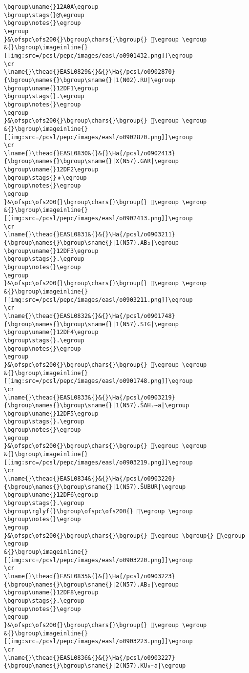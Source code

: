 \begin{verbatim}
\bgroup\uname{}12A0A\egroup
\bgroup\stags{}@\egroup
\bgroup\notes{}\egroup
\egroup
}&\ofspc\ofs200{}\bgroup\chars{}\bgroup{} 𒨊\egroup \egroup
&{}\bgroup\imageinline{}[[img:src=/pcsl/pepc/images/easl/o0901432.png]]\egroup
\cr
\lname{}\thead{}EASL0829&{}&{}\Ha{/pcsl/o0902870}{\bgroup\names{}\bgroup\sname{}|1(N02).RU|\egroup
\bgroup\uname{}12DF1\egroup
\bgroup\stags{}.\egroup
\bgroup\notes{}\egroup
\egroup
}&\ofspc\ofs200{}\bgroup\chars{}\bgroup{} 𒷱\egroup \egroup
&{}\bgroup\imageinline{}[[img:src=/pcsl/pepc/images/easl/o0902870.png]]\egroup
\cr
\lname{}\thead{}EASL0830&{}&{}\Ha{/pcsl/o0902413}{\bgroup\names{}\bgroup\sname{}|X(N57).GAR|\egroup
\bgroup\uname{}12DF2\egroup
\bgroup\stags{}﹟\egroup
\bgroup\notes{}\egroup
\egroup
}&\ofspc\ofs200{}\bgroup\chars{}\bgroup{} 𒷲\egroup \egroup
&{}\bgroup\imageinline{}[[img:src=/pcsl/pepc/images/easl/o0902413.png]]\egroup
\cr
\lname{}\thead{}EASL0831&{}&{}\Ha{/pcsl/o0903211}{\bgroup\names{}\bgroup\sname{}|1(N57).AB₂|\egroup
\bgroup\uname{}12DF3\egroup
\bgroup\stags{}.\egroup
\bgroup\notes{}\egroup
\egroup
}&\ofspc\ofs200{}\bgroup\chars{}\bgroup{} 𒷳\egroup \egroup
&{}\bgroup\imageinline{}[[img:src=/pcsl/pepc/images/easl/o0903211.png]]\egroup
\cr
\lname{}\thead{}EASL0832&{}&{}\Ha{/pcsl/o0901748}{\bgroup\names{}\bgroup\sname{}|1(N57).SIG|\egroup
\bgroup\uname{}12DF4\egroup
\bgroup\stags{}.\egroup
\bgroup\notes{}\egroup
\egroup
}&\ofspc\ofs200{}\bgroup\chars{}\bgroup{} 𒷴\egroup \egroup
&{}\bgroup\imageinline{}[[img:src=/pcsl/pepc/images/easl/o0901748.png]]\egroup
\cr
\lname{}\thead{}EASL0833&{}&{}\Ha{/pcsl/o0903219}{\bgroup\names{}\bgroup\sname{}|1(N57).ŠAH₂∼a|\egroup
\bgroup\uname{}12DF5\egroup
\bgroup\stags{}.\egroup
\bgroup\notes{}\egroup
\egroup
}&\ofspc\ofs200{}\bgroup\chars{}\bgroup{} 𒷵\egroup \egroup
&{}\bgroup\imageinline{}[[img:src=/pcsl/pepc/images/easl/o0903219.png]]\egroup
\cr
\lname{}\thead{}EASL0834&{}&{}\Ha{/pcsl/o0903220}{\bgroup\names{}\bgroup\sname{}|1(N57).ŠUBUR|\egroup
\bgroup\uname{}12DF6\egroup
\bgroup\stags{}.\egroup
\bgroup\rglyf{}\bgroup\ofspc\ofs200{} 𒷶\egroup \egroup
\bgroup\notes{}\egroup
\egroup
}&\ofspc\ofs200{}\bgroup\chars{}\bgroup{} 𒷷\egroup \bgroup{} 𒷶\egroup \egroup
&{}\bgroup\imageinline{}[[img:src=/pcsl/pepc/images/easl/o0903220.png]]\egroup
\cr
\lname{}\thead{}EASL0835&{}&{}\Ha{/pcsl/o0903223}{\bgroup\names{}\bgroup\sname{}|2(N57).AB₂|\egroup
\bgroup\uname{}12DF8\egroup
\bgroup\stags{}.\egroup
\bgroup\notes{}\egroup
\egroup
}&\ofspc\ofs200{}\bgroup\chars{}\bgroup{} 𒷸\egroup \egroup
&{}\bgroup\imageinline{}[[img:src=/pcsl/pepc/images/easl/o0903223.png]]\egroup
\cr
\lname{}\thead{}EASL0836&{}&{}\Ha{/pcsl/o0903227}{\bgroup\names{}\bgroup\sname{}|2(N57).KU₆∼a|\egroup

\end{verbatim}

